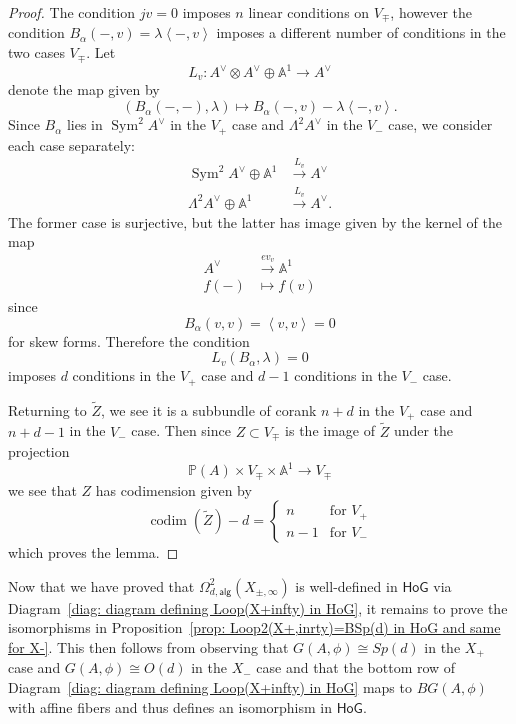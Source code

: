 \documentclass{amsart}
\theoremstyle{definition}
\renewcommand{\AA} {{\mathbb A}}
\newcommand{\HoG}{\textsf{HoG}}
\newcommand{\PP}{\mathbb{P}}
\newcommand{\Sym}{\operatorname{Sym}}
\newcommand{\alg}{\mathsf{alg}}
\newcommand{\LoopTwo}{\Omega^{2}_{d,\alg}}
\begin{document}
\begin{proof}
The condition $jv=0$ imposes $n$ linear conditions on $V_{\mp}$,
however the condition $B_{\alpha}(-,v) = \lambda \left\langle -,v
\right\rangle$ imposes a different number of conditions in the two
cases $V_{\mp}$. Let 
\[
L_{v}: A^{\vee}\otimes A^{\vee}\oplus \AA^{1} \to A^{\vee}
\]
denote the map given by 
\[
(B_{\alpha}(-,-),\lambda )\mapsto B_{\alpha}(-,v)-\lambda \left\langle
-,v \right\rangle .
\]
Since $B_{\alpha}$ lies in $\Sym^{2}A^{\vee}$ in the $V_{+}$ case and
$\Lambda^{2}A^{\vee}$ in the $V_{-}$ case, we consider each case
separately: 
\begin{align*}
\Sym^{2}A^{\vee} \oplus \AA^{1} &\xrightarrow{L_{v}}A^{\vee}\\
\Lambda ^{2}A^{\vee} \oplus \AA^{1} &\xrightarrow{L_{v}}A^{\vee}.
\end{align*}
The former case is surjective, but the latter has image given by the
kernel of the map
\begin{align*}
A^{\vee}&\xrightarrow{ev_{v}} \AA^{1} \\
f(-) &\mapsto f(v)
\end{align*}
since 
\[
B_{\alpha}(v,v)=\left\langle v,v \right\rangle = 0
\]
for skew forms. Therefore the condition 
\[
L_{v}(B_{\alpha},\lambda )=0
\]
imposes $d$ conditions in the $V_{+}$ case and $d-1$ conditions in the
$V_{-}$ case. 

Returning to $\tilde{Z}$, we see it is a subbundle of corank $n+d$ in
the $V_{+}$ case and $n+d-1$ in the $V_{-}$ case. Then since $Z\subset
V_{\mp}$ is the image of $\tilde{Z}$ under the projection 
\[
\PP (A)\times V_{\mp}\times \AA^{1} \to V_{\mp }
\]
we see that $Z$ has codimension given by 
\[
\operatorname{codim}(\tilde{Z})-d = \begin{cases}
n&\text{for $V_{+}$}\\
n-1&\text{for $V_{-}$}
\end{cases}
\]
which proves the lemma.
\end{proof}
Now that we have proved that $\LoopTwo (X_{\pm,\infty })$ is
well-defined in $\HoG$ via Diagram~\eqref{diag: diagram defining
Loop(X+infty) in HoG}, it remains to prove the isomorphisms in
Proposition~\ref{prop: Loop2(X+,inrty)=BSp(d) in HoG and same for
X-}. This
then follows from observing that $G(A,\phi )\cong Sp(d)$ in the $X_{+}$
case and $G(A,\phi )\cong O(d)$ in the $X_{-}$ case and that the
bottom row of Diagram~\eqref{diag: diagram defining Loop(X+infty) in
HoG} maps to $BG(A,\phi )$ with affine fibers and thus defines an
isomorphism in $\HoG$. 
\end{document}
